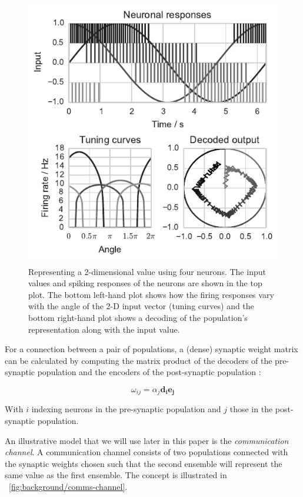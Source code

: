 \documentclass[conference]{IEEEtran}
\renewcommand{\vec}{\mathbf}  %
\begin{document}
  \begin{figure}[!t]
    \includegraphics{figures/nef-1}
    \caption{%
      Representing a 2-dimensional value using four neurons. The input values and spiking responses of the neurons are shown in the top plot.
      The bottom left-hand plot shows how the firing responses vary with the angle of the 2-D input vector (tuning curves) and the bottom right-hand plot shows a decoding of the population's representation along with the input value.}
    \label{fig:background/nef-1}
  \end{figure}

For a connection between a pair of populations, a (dense) synaptic weight matrix can be calculated by computing the matrix product of the decoders of the pre-synaptic population and the encoders of the post-synaptic population \parencite{Stewart2014}:

\begin{equation}
  \omega_{ij} = \alpha_j \vec{d_i}\vec{e_j}  \label{eq:weights}
\end{equation}

With $i$ indexing neurons in the pre-synaptic population and $j$ those in the post-synaptic population.

An illustrative model that we will use later in this paper is the \textit{communication channel}.
  A communication channel consists of two populations connected with the synaptic weights chosen such that the second ensemble will represent the same value as the first ensemble.
  The concept is illustrated in \figurename~\ref{fig:background/comms-channel}.
\end{document}

